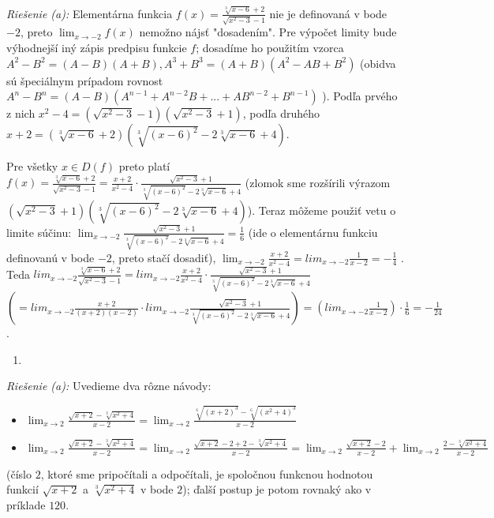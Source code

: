 \textit{Riešenie (a):}
Elementárna funkcia $f(x)=\frac{\sqrt[3]{x-6}+2}{\sqrt{x^2-3}-1}$ nie je definovaná v bode $-2$, preto $\lim_{x \rightarrow -2} f(x)$ nemožno nájsť "dosadením". Pre výpočet limity bude výhodnejší iný zápis predpisu funkcie $f$; dosadíme ho použitím vzorca $A^2-B^2=(A-B)(A+B),A^3+B^3=(A+B)(A^2-AB+B^2)$ (obidva sú špeciálnym prípadom rovnost $A^n-B^n=(A-B)(A^{n-1}+A^{n-2}B+...+AB^{n-2}+B^{n-1})$ ). Podľa prvého z nich $x^2-4=(\sqrt{x^2-3}-1)(\sqrt{x^2-3}+1)$, podľa druhého $x+2=(\sqrt[3]{x-6}+2)(\sqrt[3]{(x-6)^2}-2\sqrt[3]{x-6}+4)$.

Pre všetky $x \in D(f)$ preto platí $f(x)=\frac{\sqrt[3]{x-6}+2}{\sqrt{x^2-3}-1}=\frac{x+2}{x^2-4}\cdot\frac{\sqrt{x^2-3}+1}{\sqrt[3]{(x-6)^2}-2\sqrt[3]{x-6}+4}$ (zlomok sme rozšírili výrazom $(\sqrt{x^2-3}+1)(\sqrt[3]{(x-6)^2}-2\sqrt[3]{x-6}+4)$). Teraz môžeme použiť vetu o limite súčinu: $\lim_{x \rightarrow -2} \frac{\sqrt{x^2-3}+1}{\sqrt[3]{(x-6)^2}-2\sqrt[3]{x-6}+4}=\frac{1}{6}$ (ide o elementárnu funkciu definovanú v bode $-2$, preto stačí dosadiť), $\lim_{x \rightarrow -2} \frac{x+2}{x^2-4}=lim_{x \rightarrow -2} \frac{1}{x-2}=-\frac{1}{4}$ . Teda $lim_{x \rightarrow -2} \frac{\sqrt[3]{x-6}+2}{\sqrt{x^2-3}-1}=lim_{x \rightarrow -2}  \frac{x+2}{x^2-4} \cdot \frac{\sqrt{x^2-3}+1}{\sqrt[3]{(x-6)^2}-2\sqrt[3]{x-6}+4}$    $(=lim_{x \rightarrow -2} \frac{x+2}{(x+2)(x-2)}\cdot lim_{x \rightarrow -2} \frac{\sqrt{x^2-3}+1}{\sqrt[3]{(x-6)^2}-2\sqrt[3]{x-6}+4})=(lim_{x \rightarrow -2} \frac{1}{x-2})\cdot \frac{1}{6}=-\frac{1}{24}$.

\begin{enumerate}[resume]
	\item {}
\end{enumerate}

\textit{Riešenie (a):}
Uvedieme dva rôzne návody:
\begin{itemize}
\item $\lim_{x \rightarrow 2} \frac{\sqrt{x+2}-\sqrt[3]{x^2+4}}{x-2}=\lim_{x \rightarrow 2} \frac{\sqrt[6]{(x+2)^3}-\sqrt[6]{(x^2+4)^3}}{x-2}$
\item $\lim_{x \rightarrow 2} \frac{\sqrt{x+2}-\sqrt[3]{x^2+4}}{x-2}=\lim_{x \rightarrow 2} \frac{\sqrt{x+2}-2+2-\sqrt[3]{x^2+4}}{x-2}=\lim_{x \rightarrow 2} \frac{\sqrt{x+2}-2}{x-2}+\lim_{x \rightarrow 2} \frac{2-\sqrt[3]{x^2+4}}{x-2}$
\end{itemize}

(číslo $2$, ktoré sme pripočítali a odpočítali, je spoločnou funkcnou hodnotou funkcií $\sqrt{x+2}$ a $\sqrt[3]{x^2+4}$ v bode $2$); ďalší postup je potom rovnaký ako v príklade $120$.

